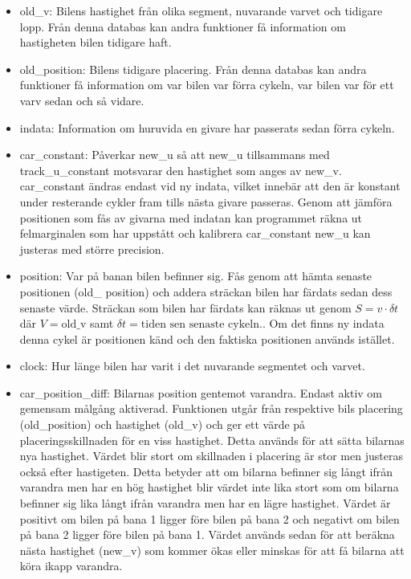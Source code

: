     \begin{itemize}
      
      \item old\_v: Bilens hastighet från olika segment, nuvarande varvet och
        tidigare lopp. Från denna databas kan andra funktioner få information
        om hastigheten bilen tidigare haft.
      
      \item old\_position: Bilens tidigare placering. Från denna databas kan
        andra funktioner få information om var bilen var förra cykeln, var
        bilen var för ett varv sedan och så vidare.

      \item indata: Information om huruvida en givare har passerats sedan förra
        cykeln.
      
      \item car\_constant: Påverkar new\_u så att new\_u tillsammans med
        track\_u\_constant motsvarar den hastighet som anges av new\_v.
        car\_constant ändras endast vid ny indata, vilket innebär att den är
        konstant under resterande cykler fram tills nästa givare passeras.
        Genom att jämföra positionen som fås av givarna med indatan kan
        programmet räkna ut felmarginalen som har uppstått och kalibrera
        car\_constant new\_u kan justeras med större precision.
      
      \item position: Var på banan bilen befinner sig. Fås genom att hämta
        senaste positionen (old\_ position) och addera sträckan bilen har
        färdats sedan dess senaste värde. Sträckan som bilen har färdats kan
        räknas ut genom $S = v \cdot \delta t$ där $V = \textrm{old\_v}$ samt
        $\delta t = \textrm{tiden sen senaste cykeln}.$. Om det finns ny indata
        denna cykel är positionen känd och den faktiska positionen används
        istället.
      
      \item clock: Hur länge bilen har varit i det nuvarande segmentet och
        varvet.

      \item car\_position\_diff: Bilarnas position gentemot varandra. Endast
        aktiv om gemensam målgång aktiverad. Funktionen utgår från respektive
        bils placering (old\_position) och hastighet (old\_v) och ger ett värde
        på placeringsskillnaden för en viss hastighet. Detta används för att
        sätta bilarnas nya hastighet. Värdet blir stort om skillnaden i
        placering är stor men justeras också efter hastigeten. Detta betyder
        att om bilarna befinner sig långt ifrån varandra men har en hög
        hastighet blir värdet inte lika stort som om bilarna befinner sig lika
        långt ifrån varandra men har en lägre hastighet. Värdet är positivt om
        bilen på bana 1 ligger före bilen på bana 2 och negativt om bilen på
        bana 2 ligger före bilen på bana 1.  Värdet används sedan för att
        beräkna nästa hastighet (new\_v) som kommer ökas eller minskas för att
        få bilarna att köra ikapp varandra. 


\end{itemize}
